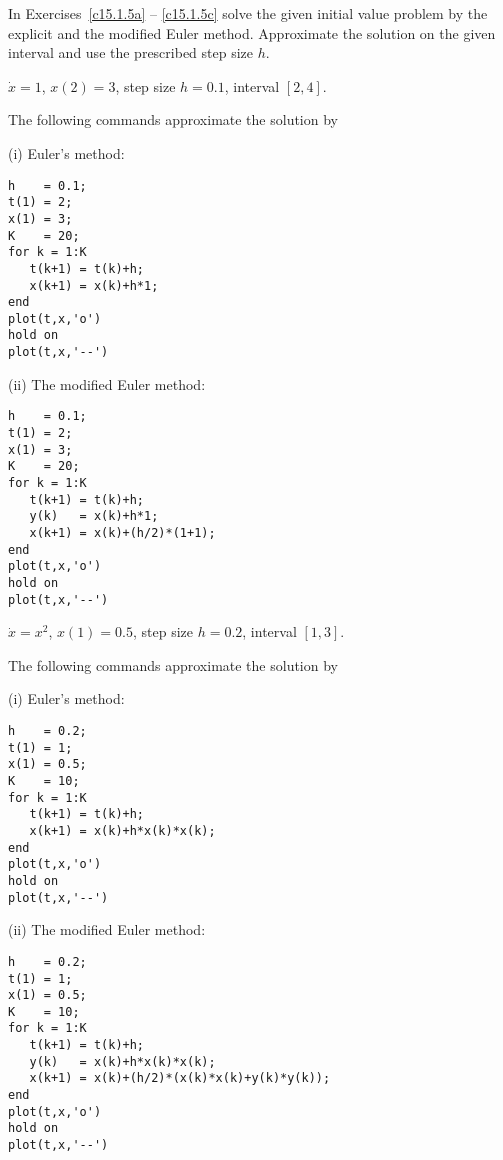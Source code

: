 \documentclass{ximera}
\begin{document}
\noindent In Exercises~\ref{c15.1.5a} -- \ref{c15.1.5c} solve
the given initial value problem by the explicit and the
modified Euler method.  Approximate the solution on the given interval
and use the prescribed step size $h$.
\begin{computerExercise} \label{c15.1.5a}
$\dot x = 1$, $x(2)=3$, step size $h=0.1$, interval $[2,4]$.

\begin{solution}
The following \Matlab commands approximate the
solution by

(i) Euler's method:
\begin{verbatim}
h    = 0.1;
t(1) = 2;
x(1) = 3;
K    = 20;
for k = 1:K
   t(k+1) = t(k)+h;
   x(k+1) = x(k)+h*1;
end
plot(t,x,'o')
hold on
plot(t,x,'--')
\end{verbatim}

(ii) The modified Euler method:
\begin{verbatim}
h    = 0.1;
t(1) = 2;
x(1) = 3;
K    = 20;
for k = 1:K
   t(k+1) = t(k)+h;
   y(k)   = x(k)+h*1;
   x(k+1) = x(k)+(h/2)*(1+1);
end
plot(t,x,'o')
hold on
plot(t,x,'--')
\end{verbatim}


\end{solution}
\end{computerExercise}
\begin{computerExercise} \label{c15.1.5b}
$\dot x = x^2$, $x(1)=0.5$, step size $h=0.2$, interval $[1,3]$.

\begin{solution}
The following \Matlab commands approximate the solution by

(i) Euler's method:
\begin{verbatim}
h    = 0.2;
t(1) = 1;
x(1) = 0.5;
K    = 10;
for k = 1:K
   t(k+1) = t(k)+h;
   x(k+1) = x(k)+h*x(k)*x(k);
end
plot(t,x,'o')
hold on
plot(t,x,'--')
\end{verbatim}

(ii)  The modified Euler method:
\begin{verbatim}
h    = 0.2;
t(1) = 1;
x(1) = 0.5;
K    = 10;
for k = 1:K
   t(k+1) = t(k)+h;
   y(k)   = x(k)+h*x(k)*x(k);
   x(k+1) = x(k)+(h/2)*(x(k)*x(k)+y(k)*y(k));
end
plot(t,x,'o')
hold on
plot(t,x,'--')
\end{verbatim}

\end{solution}
\end{computerExercise}
\end{document}
